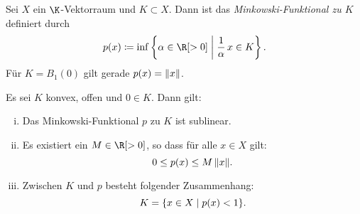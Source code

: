 \nnDef\label{vl06:minkowski} Sei $X$ ein $\K$-Vektorraum und $K\subset X$. Dann ist das
\emph{Minkowski-Funktional zu $K$} definiert durch
\[ p(x) \defeq \inf\left\{ \alpha\in\R[>0] \Mid \frac{1}{\alpha}\,x \in K \right\}
. \]
Für $K=B_1(0)$ gilt gerade $p(x) = \lVert x\rVert$.

\pagebreak[2]
\begin{thLemma} \label{vl06:lemma4.12}
    Es sei $K$ konvex, offen und $0\in K$. Dann gilt:
    \begin{enumerate}[i)]
        \item \label{vl06:lemma4.12:i}
            Das Minkowski-Funktional $p$ zu $K$ ist sublinear.
            
        \item \label{vl06:lemma4.12:ii}
            Es existiert ein $M\in\R[>0]$, so dass für alle $x\in X$ gilt:
            \[ 0 \leq p(x) \leq M\,\lVert x\rVert  . \]
            
        \item \label{vl06:lemma4.12:iii}
            Zwischen $K$ und $p$ besteht folgender Zusammenhang:
            \[ K = \{ x\in X \Mid p(x) < 1 \}  . \]
    \end{enumerate}
\end{thLemma}

